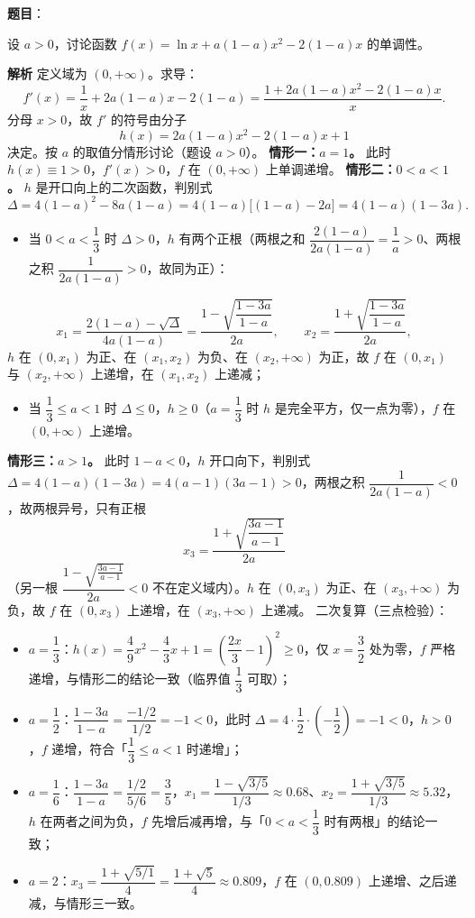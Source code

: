 \begin{answer}

\textbf{题目}：

设 $a>0$，讨论函数 $f(x)=\ln x+a(1-a)x^2-2(1-a)x$ 的单调性。

\textbf{解析}
定义域为 $(0,+\infty)$。求导：
\nopagebreak[4]
\[
f'(x)=\frac1x+2a(1-a)x-2(1-a)
=\frac{1+2a(1-a)x^2-2(1-a)x}{x}.
\]
分母 $x>0$，故 $f'$ 的符号由分子
\nopagebreak[4]
\[
h(x)=2a(1-a)x^2-2(1-a)x+1
\]
决定。按 $a$ 的取值分情形讨论（题设 $a>0$）。
\textbf{情形一：$a=1$。} 此时 $h(x)\equiv1>0$，$f'(x)>0$，$f$ 在 $(0,+\infty)$ 上单调递增。
\textbf{情形二：$0<a<1$。} $h$ 是开口向上的二次函数，判别式
\nopagebreak[4]
\[
\Delta=4(1-a)^2-8a(1-a)=4(1-a)\big[(1-a)-2a\big]=4(1-a)(1-3a).
\]
\begin{itemize}
\item 当 $0<a<\dfrac13$ 时 $\Delta>0$，$h$ 有两个正根（两根之和 $\dfrac{2(1-a)}{2a(1-a)}=\dfrac1a>0$、两根之积 $\dfrac{1}{2a(1-a)}>0$，故同为正）：
\end{itemize}
\nopagebreak[4]
\[
x_1=\frac{2(1-a)-\sqrt{\Delta}}{4a(1-a)}=\frac{1-\sqrt{\dfrac{1-3a}{1-a}}}{2a},\qquad
x_2=\frac{1+\sqrt{\dfrac{1-3a}{1-a}}}{2a},
\]
$h$ 在 $(0,x_1)$ 为正、在 $(x_1,x_2)$ 为负、在 $(x_2,+\infty)$ 为正，故 $f$ 在 $(0,x_1)$ 与 $(x_2,+\infty)$ 上递增，在 $(x_1,x_2)$ 上递减；
\begin{itemize}
\item 当 $\dfrac13\leqslant a<1$ 时 $\Delta\leqslant0$，$h\geqslant0$（$a=\dfrac13$ 时 $h$ 是完全平方，仅一点为零），$f$ 在 $(0,+\infty)$ 上递增。
\end{itemize}
\textbf{情形三：$a>1$。} 此时 $1-a<0$，$h$ 开口向下，判别式 $\Delta=4(1-a)(1-3a)=4(a-1)(3a-1)>0$，两根之积 $\dfrac{1}{2a(1-a)}<0$，故两根异号，只有正根
\nopagebreak[4]
\[
x_3=\frac{1+\sqrt{\dfrac{3a-1}{a-1}}}{2a}
\]
（另一根 $\dfrac{1-\sqrt{\frac{3a-1}{a-1}}}{2a}<0$ 不在定义域内）。$h$ 在 $(0,x_3)$ 为正、在 $(x_3,+\infty)$ 为负，故 $f$ 在 $(0,x_3)$ 上递增，在 $(x_3,+\infty)$ 上递减。
二次复算（三点检验）：
\begin{itemize}
\item $a=\dfrac13$：$h(x)=\dfrac49x^2-\dfrac43x+1=\left(\dfrac{2x}{3}-1\right)^2\geqslant0$，仅 $x=\dfrac32$ 处为零，$f$ 严格递增，与情形二的结论一致（临界值 $\dfrac13$ 可取）；
\item $a=\dfrac12$：$\dfrac{1-3a}{1-a}=\dfrac{-1/2}{1/2}=-1<0$，此时 $\Delta=4\cdot\dfrac12\cdot\left(-\dfrac12\right)=-1<0$，$h>0$，$f$ 递增，符合「$\dfrac13\leqslant a<1$ 时递增」；
\item $a=\dfrac16$：$\dfrac{1-3a}{1-a}=\dfrac{1/2}{5/6}=\dfrac35$，$x_1=\dfrac{1-\sqrt{3/5}}{1/3}\approx0.68$、$x_2=\dfrac{1+\sqrt{3/5}}{1/3}\approx5.32$，$h$ 在两者之间为负，$f$ 先增后减再增，与「$0<a<\dfrac13$ 时有两根」的结论一致；
\item $a=2$：$x_3=\dfrac{1+\sqrt{5/1}}{4}=\dfrac{1+\sqrt5}{4}\approx0.809$，$f$ 在 $(0,0.809)$ 上递增、之后递减，与情形三一致。
\end{itemize}


\end{answer}
